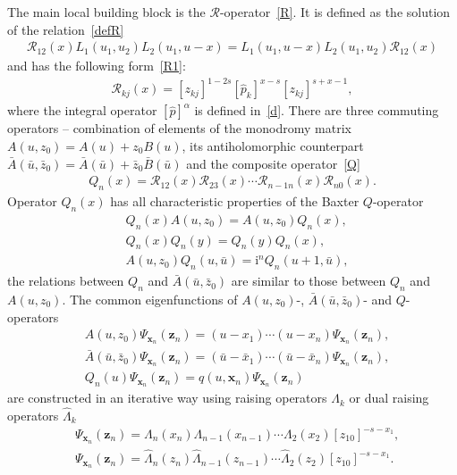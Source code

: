 \documentclass[pdftex]{sigma}
\renewcommand{\imath}{\mathrm{i}}
\numberwithin{equation}{section}
\begin{document}
The main local building block is the $\mathcal{R}$-operator~\eqref{R}.
It is defined as the solution of the relation~\eqref{defR}
\begin{align*}
	\mathcal{R}_{1 2}(x) L_1(u_1, u_2) L_2(u_1, u-x) =
	L_1(u_1, u-x) L_2(u_1, u_2) \mathcal{R}_{1 2}(x)
\end{align*}
and has the following form~\eqref{R1}:
\begin{align*}
	\mathcal{R}_{k j}(x) = [z_{kj}]^{1-2s} [\hat{p}_k]^{x-s} [z_{kj}]^{s+x-1} ,
\end{align*}
where the integral operator $[\hat{p}]^\alpha$ is defined in~\eqref{d}.
There are three commuting operators -- combination of elements
of the monodromy matrix $A(u,z_0) = A(u)+z_0 B(u)$, its antiholomorphic counterpart $\bar{A}(\bar{u},\bar{z}_0) = \bar{A}(\bar{u})+\bar{z}_0 \bar{B}(\bar{u})$ and the composite
operator~\eqref{Q}
\begin{align*}
	Q_n(x) =
	\mathcal{R}_{12}(x) \mathcal{R}_{23}(x)\cdots
	\mathcal{R}_{n-1 n}(x) \mathcal{R}_{n 0}(x) .
\end{align*}
Operator $Q_n(x)$ has all characteristic properties of the Baxter $Q$-operator
\begin{align*}
	& Q_n(x) A(u,z_0) = A(u,z_0) Q_n(x) , \\
	& Q_n(x) Q_n(y) = Q_n(y) Q_n(x) ,\\
	& A(u,z_0) Q_n(u,\bar{u}) = \imath^n Q_n(u+1,\bar{u}) ,
\end{align*}
the relations between $Q_n$ and $\bar{A}(\bar{u},\bar{z}_0)$ are similar to those between $Q_n$ and $A(u,z_0)$.
The common eigenfunctions of $A(u,z_0)$-, $\bar{A}(\bar{u},\bar{z}_0)$- and $Q$-operators
\begin{align*}
	& A(u,z_0)
	\Psi_{\bm{x}_n}(\bm z_n) = (u-x_1)\cdots(u-x_n)
	\Psi_{\bm{x}_n}(\bm z_n) , \\
	& \bar{A}(\bar{u},\bar{z}_0)
	\Psi_{\bm{x}_n}(\bm z_n) = (\bar{u}-\bar{x}_1)\cdots(\bar{u}-\bar{x}_n)
	\Psi_{\bm{x}_n}(\bm z_n) , \\
	& Q_n(u) \Psi_{\bm x_n}(\bm z_n)
	= q(u ,\bm x_{n}) \Psi_{\bm x_n}(\bm z_n)
\end{align*}
are constructed in an iterative way using raising
operators $\Lambda_k$ or dual raising operators $\hat{\Lambda}_k$
\begin{align*}
	&\Psi_{\bm{x}_n}(\bm z_n)=
	\Lambda_n( x_n)
	\Lambda_{n-1}( x_{n-1})\cdots
	\Lambda_{2}( x_{2}) [z_{10}]^{-s-x_1} , \\
	&\Psi_{\bm{x}_n}(\bm z_n)=
	\hat{\Lambda}_n( z_n)
	\hat{\Lambda}_{n-1}( z_{n-1})\cdots
	\hat{\Lambda}_{2}(z_{2}) [z_{10}]^{-s-x_1} .
\end{align*}
\end{document}

